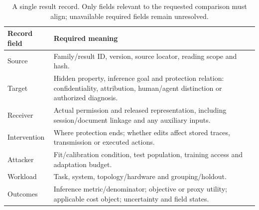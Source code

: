 \begin{table}[t]\centering\footnotesize
\caption{A single result record. Only fields relevant to the requested comparison must align; unavailable required fields remain unresolved.}\label{tab:result-record}
\begin{tabularx}{\columnwidth}{@{}p{}Y@{}}\toprule
Record field & Required meaning\\\midrule
Source & Family/result ID, version, source locator, reading scope and hash.\\
Target & Hidden property, inference goal and protection relation: confidentiality, attribution, human/agent distinction or authorized diagnosis.\\
Receiver & Actual permission and released representation, including session/document linkage and any auxiliary inputs.\\
Intervention & Where protection ends; whether edits affect stored traces, transmission or executed actions.\\
Attacker & Fit/calibration condition, test population, training access and adaptation budget.\\
Workload & Task, system, topology/hardware and grouping/holdout.\\
Outcomes & Inference metric/denominator; objective or proxy utility; applicable cost object; uncertainty and field states.\\\bottomrule
\end{tabularx}\end{table}
